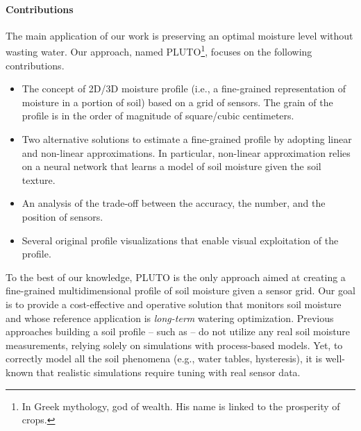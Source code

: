 \paragraph{Contributions} The main application of our work is preserving an optimal moisture level without wasting water.
Our approach, named PLUTO\footnote{In Greek mythology, god of wealth. His name is linked to the prosperity of crops.}, focuses on the following contributions.
\begin{itemize}
    \item The concept of 2D/3D moisture profile (i.e., a fine-grained representation of moisture in a portion of soil) based on a grid of sensors. 
    The grain of the profile is in the order of magnitude of square/cubic centimeters.
    \item Two alternative solutions to estimate a fine-grained profile by adopting linear and non-linear approximations.
    In particular, non-linear approximation relies on a neural network that learns a model of soil moisture given the soil texture.
    \item An analysis of the trade-off between the accuracy, the number, and the position of sensors.
    \item Several original profile visualizations that enable visual exploitation of the profile.
\end{itemize}

To the best of our knowledge, PLUTO is the only approach aimed at creating a fine-grained multidimensional profile of soil moisture given a sensor grid.
Our goal is to provide a cost-effective and operative solution that monitors soil moisture and whose reference application is \textit{long-term} watering optimization.
Previous approaches building a soil profile -- such as \cite{Hinnell2010535} -- do not utilize any real soil moisture measurements, relying solely on simulations with process-based models.
Yet, to correctly model all the soil phenomena (e.g., water tables, hysteresis), it is well-known that realistic simulations require tuning with real sensor data.

